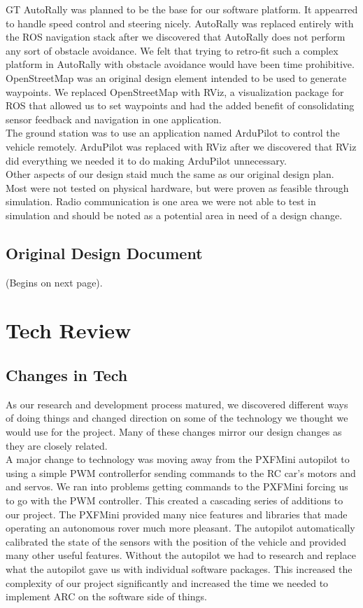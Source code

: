 \documentclass[compsoc,draftclsnofoot,onecolumn,10pt]{IEEEtran}
\begin{document}
GT AutoRally was planned to be the base for our software platform. It appearred to handle speed control and steering nicely. AutoRally was replaced entirely with the ROS navigation stack after we discovered that AutoRally does not perform any sort of obstacle avoidance. We felt that trying to retro-fit such a complex platform in AutoRally with obstacle avoidance would have been time prohibitive. OpenStreetMap was an original design element intended to be used to generate waypoints. We replaced OpenStreetMap with RViz, a visualization package for ROS that allowed us to set waypoints and had the added benefit of consolidating sensor feedback and navigation in one application.\\
The ground station was to use an application named ArduPilot to control the vehicle remotely. ArduPilot was replaced with RViz after we discovered that RViz did everything we needed it to do making ArduPilot unnecessary.\\
Other aspects of our design staid much the same as our original design plan. Most were not tested on physical hardware, but were proven as feasible through simulation. Radio communication is one area we were not able to test in simulation and should be noted as a potential area in need of a design change.


\subsection{Original Design Document}
(Begins on next page).




\clearpage 
\section{Tech Review}
\subsection{Changes in Tech}
As our research and development process matured, we discovered different ways of doing things and changed direction on some of the technology we thought we would use for the project. 
Many of these changes mirror our design changes as they are closely related.\\

A major change to technology was moving away from the PXFMini autopilot to using a simple PWM controllerfor sending commands to the RC car's motors and and servos. 
We ran into problems getting commands to the PXFMini forcing us to go with the PWM controller. 
This created a cascading series of additions to our project. 
The PXFMini provided many nice features and libraries that made operating an autonomous rover much more pleasant. 
The autopilot automatically calibrated the state of the sensors with the position of the vehicle and provided many other useful features. 
Without the autopilot we had to research and replace what the autopilot gave us with individual software packages. 
This increased the complexity of our project significantly and increased the time we needed to implement ARC on the software side of things.\\
\end{document}
